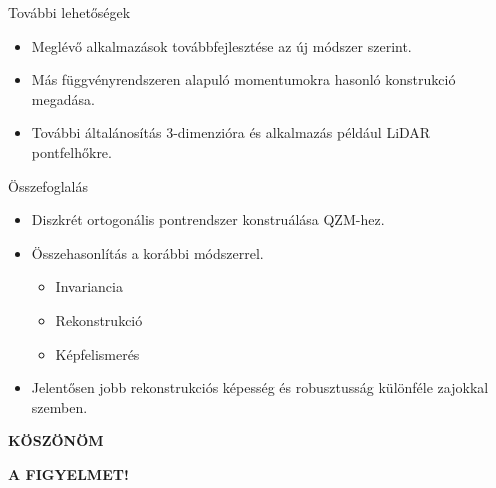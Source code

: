 \documentclass{beamer}
\begin{document}
\begin{frame}{További lehetőségek}
    \begin{itemize}
    \item Meglévő alkalmazások továbbfejlesztése az új módszer szerint.
    \item Más függvényrendszeren alapuló momentumokra hasonló konstrukció megadása.
    \item További általánosítás 3-dimenzióra és alkalmazás például LiDAR pontfelhőkre.
    \end{itemize}
\end{frame}

\begin{frame}{Összefoglalás}
    \begin{itemize}
    \item Diszkrét ortogonális pontrendszer konstruálása QZM-hez.
    \item Összehasonlítás a korábbi módszerrel.
        \begin{itemize}
        \item Invariancia
        \item Rekonstrukció
        \item Képfelismerés
        \end{itemize}
    \item Jelentősen jobb rekonstrukciós képesség és robusztusság különféle zajokkal szemben.
    \end{itemize}
\end{frame}


{
%
\begin{frame}{}

\textbf{\huge\color{white} KÖSZÖNÖM}

\bigskip

\textbf{\huge\color{white} A FIGYELMET!}

\end{frame}
}
\end{document}
